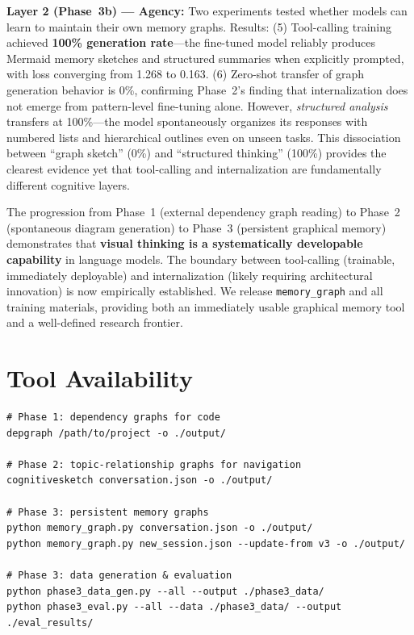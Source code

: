 \documentclass[11pt,a4paper]{article}
\begin{document}
\textbf{Layer 2 (Phase~3b) — Agency:} Two experiments tested whether models can learn to maintain their own memory graphs. Results: (5) Tool-calling training achieved \textbf{100\% generation rate}---the fine-tuned model reliably produces Mermaid memory sketches and structured summaries when explicitly prompted, with loss converging from 1.268 to 0.163. (6) Zero-shot transfer of graph generation behavior is 0\%, confirming Phase~2's finding that internalization does not emerge from pattern-level fine-tuning alone. However, \textit{structured analysis} transfers at 100\%---the model spontaneously organizes its responses with numbered lists and hierarchical outlines even on unseen tasks. This dissociation between ``graph sketch'' (0\%) and ``structured thinking'' (100\%) provides the clearest evidence yet that tool-calling and internalization are fundamentally different cognitive layers.

The progression from Phase~1 (external dependency graph reading) to Phase~2 (spontaneous diagram generation) to Phase~3 (persistent graphical memory) demonstrates that \textbf{visual thinking is a systematically developable capability} in language models. The boundary between tool-calling (trainable, immediately deployable) and internalization (likely requiring architectural innovation) is now empirically established. We release \texttt{memory\_graph} and all training materials, providing both an immediately usable graphical memory tool and a well-defined research frontier.


\section*{Tool Availability}

\begin{verbatim}
# Phase 1: dependency graphs for code
depgraph /path/to/project -o ./output/

# Phase 2: topic-relationship graphs for navigation
cognitivesketch conversation.json -o ./output/

# Phase 3: persistent memory graphs
python memory_graph.py conversation.json -o ./output/
python memory_graph.py new_session.json --update-from v3 -o ./output/

# Phase 3: data generation & evaluation
python phase3_data_gen.py --all --output ./phase3_data/
python phase3_eval.py --all --data ./phase3_data/ --output ./eval_results/
\end{verbatim}
\end{document}

